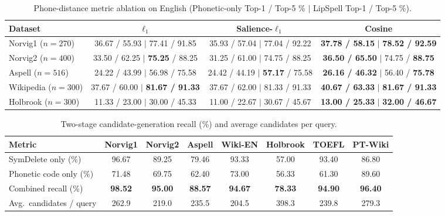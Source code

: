 \documentclass[preprint,12pt,authoryear]{elsarticle}
\begin{document}
\begin{table}[ht]
\centering
\scriptsize
\setlength{\tabcolsep}{3pt}
\caption{Phone-distance metric ablation on English (Phonetic-only Top-1 / Top-5 \% $\mid$ LipSpell Top-1 / Top-5 \%).}
\label{tab:ablation}
\begin{tabular}{lccc}
\toprule
Dataset & $\ell_1$ & Salience-$\ell_1$ & Cosine \\
\midrule
Norvig1 ($n=270$)   & 36.67 / 55.93 $\mid$ 77.41 / 91.85 & 35.93 / 57.04 $\mid$ 77.04 / 92.22 & \textbf{37.78 / 58.15} $\mid$ \textbf{78.52 / 92.59} \\
Norvig2 ($n=400$)   & 33.50 / 62.25 $\mid$ \textbf{75.25} / 88.25 & 31.25 / 61.00 $\mid$ 74.75 / 88.25 & \textbf{36.50 / 65.50} $\mid$ 74.75 / \textbf{88.75} \\
Aspell ($n=516$)    & 24.22 / 43.99 $\mid$ 56.98 / 75.58 & 24.42 / 44.19 $\mid$ \textbf{57.17} / 75.58 & \textbf{26.16 / 46.32} $\mid$ 56.40 / \textbf{75.78} \\
Wikipedia ($n=300$) & 37.67 / 60.00 $\mid$ \textbf{81.67 / 91.33} & 37.67 / 62.00 $\mid$ 81.33 / 91.33 & \textbf{40.67 / 63.33} $\mid$ \textbf{81.67 / 91.33} \\
Holbrook ($n=300$)  & 11.33 / 23.00 $\mid$ 30.00 / 45.33 & 11.00 / 22.67 $\mid$ 30.67 / 45.67 & \textbf{13.00 / 25.33} $\mid$ \textbf{32.00 / 46.67} \\
\bottomrule
\end{tabular}
\end{table}

\begin{table}[ht]
\centering
\small
\caption{Two-stage candidate-generation recall (\%) and average candidates per query.}
\label{tab:recall}
\begin{tabular}{lccccccc}
\toprule
Metric & Norvig1 & Norvig2 & Aspell & Wiki-EN & Holbrook & TOEFL & PT-Wiki \\
\midrule
SymDelete only (\%)       & 96.67 & 89.25 & 79.46 & 93.33 & 57.00 & 93.40 & 86.80 \\
Phonetic code only (\%)  & 71.48 & 69.75 & 62.40 & 73.00 & 56.33 & 61.30 & 89.60 \\
Combined recall (\%)      & \textbf{98.52} & \textbf{95.00} & \textbf{88.57} & \textbf{94.67} & \textbf{78.33} & \textbf{94.90} & \textbf{96.40} \\
Avg.\ candidates / query  & 262.9 & 219.0 & 235.5 & 204.5 & 398.3 & 239.8 & 279.3 \\
\bottomrule
\end{tabular}
\end{table}
\end{document}
